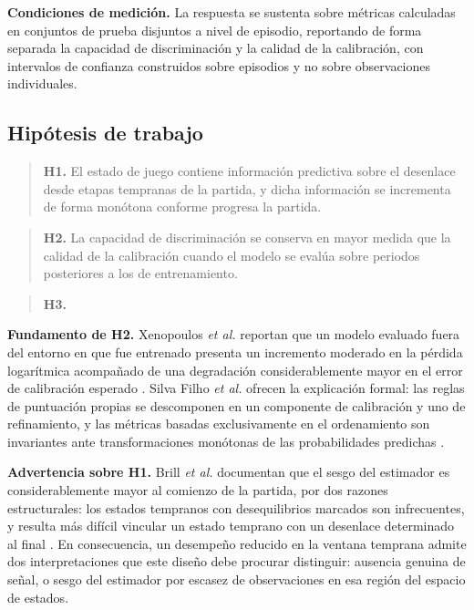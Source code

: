 
\noindent\textbf{Condiciones de medición.} La respuesta se sustenta sobre
métricas calculadas en conjuntos de prueba disjuntos a nivel de episodio,
reportando de forma separada la capacidad de discriminación y la calidad de
la calibración, con intervalos de confianza construidos sobre episodios y
no sobre observaciones individuales.

\subsection{Hipótesis de trabajo}
\label{subsec:hipotesis}

\begin{quote}
\textbf{H1.} El estado de juego contiene información predictiva sobre el
desenlace desde etapas tempranas de la partida, y dicha información se
incrementa de forma monótona conforme progresa la partida.
\end{quote}

\begin{quote}
\textbf{H2.} La capacidad de discriminación se conserva en mayor medida
que la calidad de la calibración cuando el modelo se evalúa sobre
periodos posteriores a los de entrenamiento.
\end{quote}

\begin{quote}
\textbf{H3.} 
\end{quote}

\noindent\textbf{Fundamento de H2.} Xenopoulos \textit{et al.} reportan que
un modelo evaluado fuera del entorno en que fue entrenado presenta un
incremento moderado en la pérdida logarítmica acompañado de una degradación
considerablemente mayor en el error de calibración esperado
\cite{xenopoulos_winprob_2022}. Silva Filho \textit{et al.} ofrecen la
explicación formal: las reglas de puntuación propias se descomponen en un
componente de calibración y uno de refinamiento, y las métricas basadas
exclusivamente en el ordenamiento son invariantes ante transformaciones
monótonas de las probabilidades predichas \cite{silvafilho_calibration_2023}.

\noindent\textbf{Advertencia sobre H1.} Brill \textit{et al.} documentan que
el sesgo del estimador es considerablemente mayor al comienzo de la partida,
por dos razones estructurales: los estados tempranos con desequilibrios
marcados son infrecuentes, y resulta más difícil vincular un estado temprano
con un desenlace determinado al final \cite{brill_winprob_2026}. En
consecuencia, un desempeño reducido en la ventana temprana admite dos
interpretaciones que este diseño debe procurar distinguir: ausencia genuina
de señal, o sesgo del estimador por escasez de observaciones en esa región
del espacio de estados.

